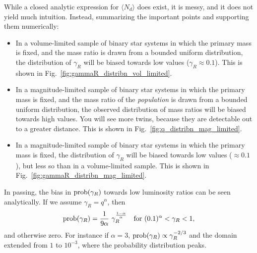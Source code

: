 \documentclass{emulateapj}
\begin{document}
While a closed analytic expression for $\langle N_d \rangle$ does exist, it is 
messy, and it does not yield much intuition. Instead, summarizing the important 
points and supporting them numerically:
\begin{itemize}
	\item In a volume-limited sample of binary star systems in which the 
	primary mass is fixed, and the mass ratio is drawn from a bounded uniform 
	distribution, the distribution of $\gamma_R$ will be biased towards low 
	values ($\gamma_R \approx 0.1$). This is shown in 
	Fig.~\ref{fig:gammaR_distribn_vol_limited}.
	\item In a magnitude-limited sample of binary star systems in which the 
	primary mass is fixed, and the mass ratio of the \textit{population} is 
	drawn from a bounded uniform distribution, the observed distribution of 
	mass ratios will be biased towards high values. You will see more twins,
  because they are detectable out to a greater distance. This is shown in 
	Fig.~\ref{fig:q_distribn_mag_limited}.
	\item In a magnitude-limited sample of binary star systems in which the 
	primary mass is fixed, the distribution of $\gamma_R$ will be biased 
	towards low values ($\approx 0.1$), but less so than in a 
	volume-limited sample. This is shown in 
	Fig.~\ref{fig:gammaR_distribn_mag_limited}.
\end{itemize}

In passing, the bias in ${\rm prob}(\gamma_R)$ towards low luminosity ratios 
can be seen analytically. If we assume $\gamma_R = q^\alpha$, then
\begin{equation}
{\rm prob}(\gamma_R) = \frac{1}{9 \alpha} \ \gamma_R^{\frac{1-\alpha}{\alpha}}
\quad {\rm for\ } (0.1)^\alpha < \gamma_R < 1,
\end{equation}
and otherwise zero. For instance if $\alpha = 3$, ${\rm prob}(\gamma_R) 
\propto \gamma_R^{-2/3}$ and the domain extended from $1$ to 
$10^{-3}$, where the probability distribution peaks.
\end{document}
